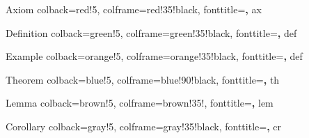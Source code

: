 
\newcommand{\R}{\mathbb{R}}
\newcommand{\C}{\mathbb{C}}
\newcommand{\Q}{\mathbb{Q}}
\newcommand{\Z}{\mathbb{Z}}
\newcommand{\F}{\mathbb{F}}
\newcommand{\N}{\mathbb{N}}


\usepackage[margin=1in]{geometry}
\usepackage{amssymb, amsthm }
\usepackage[many]{tcolorbox}
\usepackage[T1]{fontenc}
\usepackage{mathtools}
\usepackage{ragged2e}
\usepackage[framemethod=TikZ]{mdframed}
\renewcommand\qedsymbol{$\blacksquare$}
\usepackage[linesnumbered,ruled,vlined]{algorithm2e}



  {Axiom}%
  {%
    colback=red!5,
    colframe=red!35!black,
    fonttitle=\bfseries,
  }%
  {ax}%



  {Definition}%
  {%
    colback=green!5,
    colframe=green!35!black,
    fonttitle=\bfseries,
  }%
  {def}%


  {Example}%
  {%
    colback=orange!5,
    colframe=orange!35!black,
    fonttitle=\bfseries,
  }%
  {def}%



  {Theorem}%
  {%
    colback=blue!5,
    colframe=blue!90!black,
    fonttitle=\bfseries,
  }%
  {th}%



  {Lemma}%
  {%
    colback=brown!5,
    colframe=brown!35!,
    fonttitle=\bfseries,
  }%
  {lem}%


  {Corollary}%
  {%
    colback=gray!5,
    colframe=gray!35!black,
    fonttitle=\bfseries,
  }%
  {cr}%



